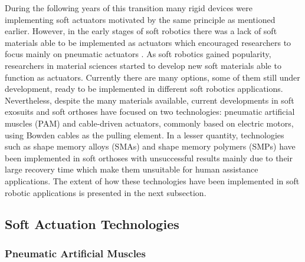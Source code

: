 During the following years of this transition many rigid devices were implementing soft actuators motivated by the same principle as mentioned earlier. However, in the early stages of soft robotics there was a lack of soft materials able to be implemented as actuators which encouraged researchers to focus mainly on pneumatic actuators \cite{Belforte2014}. As soft robotics gained popularity, researchers in material sciences started to develop new soft materials able to function as actuators. Currently there are many options, some of them still under development, ready to be implemented in different soft robotics applications. Nevertheless, despite the many materials available, current developments in soft exosuits and soft orthoses have focused on two technologies: pneumatic artificial muscles (PAM) and cable-driven actuators, commonly based on electric motors, using Bowden cables as the pulling element. In a lesser quantity, technologies such as shape memory alloys (SMAs) and shape memory polymers (SMPs) have been implemented in soft orthoses with unsuccessful results mainly due to their large recovery time which make them unsuitable for human assistance applications. The extent of how these technologies have been implemented in soft robotic applications is presented in the next subsection.

\subsection{Soft Actuation Technologies} \label{sec:SoftActuation}

\subsubsection{Pneumatic Artificial Muscles} \label{sec:PMAs}

